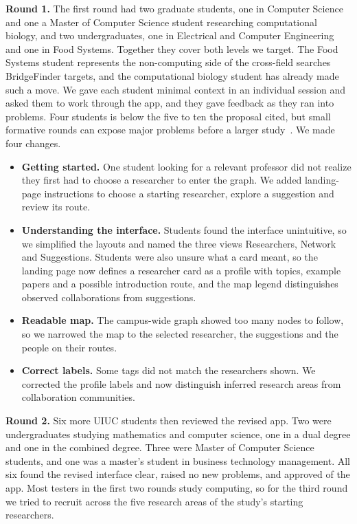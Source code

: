 \documentclass[sigconf,nonacm]{acmart}
\begin{document}
\textbf{Round 1.} The first round had two graduate students, one in Computer Science and one a Master of Computer Science student researching computational biology, and two undergraduates, one in Electrical and Computer Engineering and one in Food Systems. Together they cover both levels we target. The Food Systems student represents the non-computing side of the cross-field searches BridgeFinder targets, and the computational biology student has already made such a move. We gave each student minimal context in an individual session and asked them to work through the app, and they gave feedback as they ran into problems. Four students is below the five to ten the proposal cited, but small formative rounds can expose major problems before a larger study~\cite{nielsen1993}. We made four changes.
\begin{itemize}
\item \textbf{Getting started.} One student looking for a relevant professor did not realize they first had to choose a researcher to enter the graph. We added landing-page instructions to choose a starting researcher, explore a suggestion and review its route.
\item \textbf{Understanding the interface.} Students found the interface unintuitive, so we simplified the layouts and named the three views Researchers, Network and Suggestions. Students were also unsure what a card meant, so the landing page now defines a researcher card as a profile with topics, example papers and a possible introduction route, and the map legend distinguishes observed collaborations from suggestions.
\item \textbf{Readable map.} The campus-wide graph showed too many nodes to follow, so we narrowed the map to the selected researcher, the suggestions and the people on their routes.
\item \textbf{Correct labels.} Some tags did not match the researchers shown. We corrected the profile labels and now distinguish inferred research areas from collaboration communities.
\end{itemize}

\textbf{Round 2.} Six more UIUC students then reviewed the revised app. Two were undergraduates studying mathematics and computer science, one in a dual degree and one in the combined degree. Three were Master of Computer Science students, and one was a master's student in business technology management. All six found the revised interface clear, raised no new problems, and approved of the app. Most testers in the first two rounds study computing, so for the third round we tried to recruit across the five research areas of the study's starting researchers.
\end{document}
